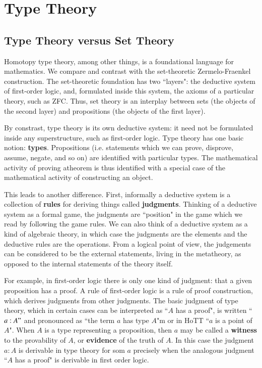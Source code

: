 %
%
%
\chapter{Type Theory}
\label{types} %

\section{Type Theory versus Set Theory}

Homotopy type theory, among other things, is a foundational language for mathematics. We compare and contrast with the set-theoretic Zermelo-Fraenkel construction. The set-theoretic foundation has two ``layers": the deductive system of first-order logic, and, formulated inside this system, the axioms of a particular theory, such as ZFC. Thus, set theory is an interplay between sets (the objects of the second layer) and propositions (the objects of the first layer).

By constrast, type theory is its own deductive system: it need not be formulated inside any superstructure, such as first-order logic. Type theory has one basic notion: \textbf{types}. Propositions (i.e. statements which we can prove, disprove, assume, negate, and so on) are identified with particular types. The mathematical activity of proving atheorem is thus identified with a special case of the mathematical activity of constructing an object.

This leads to another difference. First, informally a deductive system is a collection of \textbf{rules} for deriving things called \textbf{judgments}. Thinking of a deductive system as a formal game, the judgments are ``position" in the game which we read by following the game rules. We can also think of a deductive system as a kind of algebraic theory, in which case the judgments are the elements and the deductive rules are the operations. From a logical point of view, the judgements can be considered to be the external statements, living in the metatheory, as opposed to the internal statements of the theory itself. 

For example, in first-order logic there is only one kind of judgment: that a given proposition has a proof. A rule of first-order logic is a rule of proof construction, which derives judgments from other judgments. The basic judgment of type theory, which in certain cases can be interpreted as ``$A$ has a proof", is written ``$a : A"$ and pronounced as ``the term $a$ has type $A$"m or in HoTT ``$a$ is a point of $A$". When $A$ is a type representing a proposition, then $a$ may be called a \textbf{witness} to the provability of $A$, or \textbf{evidence} of the truth of $A$. In this case the judgment $a : A$ is derivable in type theory for som $a$ precisely when the analogous judgment ``$A$ has a proof" is derivable in first order logic.

